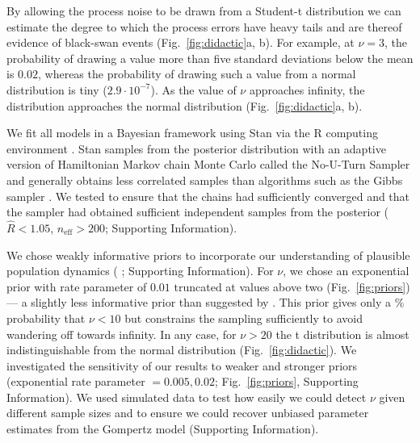 By allowing the process noise to be drawn from a Student-t distribution we can estimate the degree to which the process errors have heavy tails and are thereof evidence of black-swan events (Fig.~\ref{fig:didactic}a, b). For example, at $\nu = 3$, the probability of drawing a value more than five standard deviations below the mean is $0.02$, whereas the probability of drawing such a value from a normal distribution is tiny ($2.9\cdot10^{-7}$). As the value of $\nu$ approaches infinity, the distribution approaches the normal distribution (Fig.~\ref{fig:didactic}a, b).


We fit all models in a Bayesian framework using Stan \citep{stan-manual2014} via the R computing environment \citep{r2014}. Stan samples from the posterior distribution with an adaptive version of Hamiltonian Markov chain Monte Carlo called the No-U-Turn Sampler and generally obtains less correlated samples than algorithms such as the Gibbs sampler \citep{hoffman2014}. We tested to ensure that the chains had sufficiently converged and that the sampler had obtained sufficient independent samples from the posterior ($\widehat{R} < 1.05$, $n_\mathrm{eff} > 200$; Supporting Information).

We chose weakly informative priors to incorporate our understanding of plausible population dynamics (\citeauthor{gelman2014} \citeyear{gelman2014}; Supporting Information). For $\nu$, we chose an exponential prior with rate parameter of $0.01$ truncated at values above two (Fig.~\ref{fig:priors}) --- a slightly less informative prior than suggested by \citet{fernandez1998}. This prior gives only a \basePriorProbHeavy \% probability that $\nu < 10$ but constrains the sampling sufficiently to avoid wandering off towards infinity. In any case, for $\nu > 20$ the t distribution is almost indistinguishable from the normal distribution (Fig.~\ref{fig:didactic}). We investigated the sensitivity of our results to weaker and stronger priors (exponential rate parameter $= 0.005, 0.02$; Fig.~\ref{fig:priors}, Supporting Information). We used simulated data to test how easily we could detect $\nu$ given different sample sizes and to ensure we could recover unbiased parameter estimates from the Gompertz model (Supporting Information).


